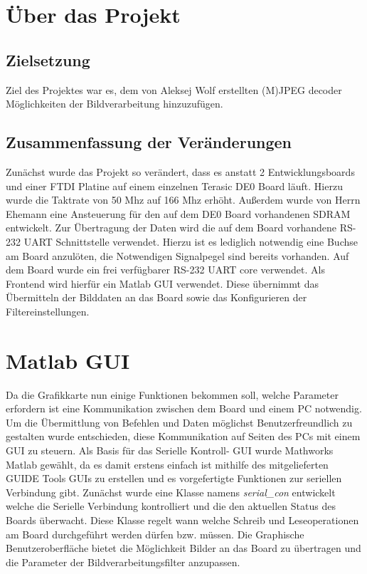 \documentclass[%
  paper=A4, %
  pagesize, %
  12pt,
  ngerman   %
]{scrreprt}  %
\begin{document}




\tableofcontents
\chapter{Über das Projekt}
\section{Zielsetzung}
Ziel des Projektes war es, dem von Aleksej Wolf erstellten (M)JPEG decoder\cite{aleksej10} Möglichkeiten der Bildverarbeitung hinzuzufügen.

\section{Zusammenfassung der Veränderungen}
Zunächst wurde das Projekt so verändert, dass es anstatt 2 Entwicklungsboards und einer FTDI Platine auf einem einzelnen Terasic DE0 Board läuft. Hierzu wurde die Taktrate von 50 Mhz auf 166 Mhz erhöht. Außerdem wurde von Herrn Ehemann eine Ansteuerung für den auf dem DE0 Board vorhandenen SDRAM entwickelt. Zur Übertragung der Daten wird die auf dem Board vorhandene RS-232 UART Schnittstelle verwendet. Hierzu ist es lediglich notwendig eine Buchse am Board anzulöten, die Notwendigen Signalpegel sind bereits vorhanden. Auf dem Board wurde ein frei verfügbarer RS-232 UART core verwendet.\cite{miller09} Als Frontend wird hierfür ein Matlab GUI verwendet. Diese übernimmt das Übermitteln der Bilddaten an das Board sowie das Konfigurieren der Filtereinstellungen.

\chapter{Matlab GUI}
\label{sec:ml_gui}
Da die Grafikkarte nun einige Funktionen bekommen soll, welche Parameter erfordern ist eine Kommunikation zwischen dem Board und einem PC notwendig. Um die Übermittlung von Befehlen und Daten möglichst Benutzerfreundlich zu gestalten wurde entschieden, diese Kommunikation auf Seiten des PCs mit einem GUI zu steuern. Als Basis für das Serielle Kontroll- GUI wurde Mathworks Matlab gewählt, da es damit erstens einfach ist mithilfe des mitgelieferten GUIDE Tools GUIs zu erstellen und es vorgefertigte Funktionen zur seriellen Verbindung gibt. Zunächst wurde eine Klasse namens \emph{serial\_con} entwickelt welche die Serielle Verbindung kontrolliert und die den aktuellen Status des Boards überwacht. Diese Klasse regelt wann welche Schreib und Leseoperationen am Board durchgeführt werden dürfen bzw. müssen. Die Graphische Benutzeroberfläche bietet die Möglichkeit Bilder an das Board zu übertragen und die Parameter der Bildverarbeitungsfilter anzupassen.
\end{document}
